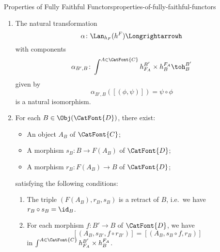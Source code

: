 \begin{proposition}{Properties of Fully Faithful Functors}{properties-of-fully-faithful-functors}
\begin{enumerate}
\begin{enumerate}
\[                    \]%
                    of the adjunction $\Lan_{F}\dashv F^{*}$ are all isomorphisms.
                \item\label{properties-of-fully-faithful-functors-interaction-with-precomposition-4-h}The natural transformation
                    \[
                        \alpha%
                        \colon%
                        \Lan_{h_{F}}(h^{F})%
                        \Longrightarrow%
                        h%
                    \]%
                    with components
                    \[
                        \alpha_{B',B}%
                        \colon%
                        \int^{A\in\CatFont{C}}h^{B'}_{F_{A}}\times h^{F_{A}}_{B}%
                        \to%
                        h^{B'}_{B}
                    \]%
                    given by
                    \[
                        \alpha_{B',B}([(\phi,\psi)])%
                        =%
                        \psi\circ\phi%
                    \]%
                    is a natural isomorphism.
                \item\label{properties-of-fully-faithful-functors-interaction-with-precomposition-4-i}For each $B\in\Obj(\CatFont{D})$, there exist:
                    \begin{itemize}
                        \item An object $A_{B}$ of $\CatFont{C}$;
                        \item A morphism $s_{B}\colon B\to F(A_{B})$ of $\CatFont{D}$;
                        \item A morphism $r_{B}\colon F(A_{B})\to B$ of $\CatFont{D}$;
                    \end{itemize}
                    satisfying the following conditions:
                    \begin{enumerate}
                        \item\label{properties-of-fully-faithful-functors-interaction-with-precomposition-4-i-a}The triple $(F(A_{B}),r_{B},s_{B})$ is a retract of $B$, i.e.\ we have $r_{B}\circ s_{B}=\id_{B}$.
                        \item\label{properties-of-fully-faithful-functors-interaction-with-precomposition-4-i-b}For each morphism $f\colon B'\to B$ of $\CatFont{D}$, we have
                            \[
                                [(A_{B},s_{B'},f\circ r_{B'})]%
                                =%
                                [(A_{B},s_{B}\circ f,r_{B})]%
                            \]%
                            in $\int^{A\in\CatFont{C}}h^{B'}_{F_{A}}\times h^{F_{A}}_{B}$.
                    \end{enumerate}
            \end{enumerate}
    \end{enumerate}
\end{proposition}
